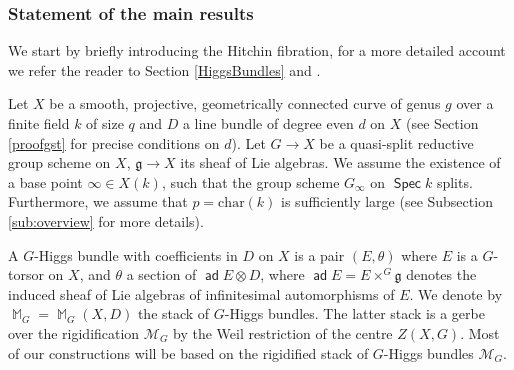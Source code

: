 \documentclass{article}
\DeclareMathOperator{\Mb}{\mathbb{M}}
\DeclareMathOperator{\G}{\mathbb{G}}
\newcommand{\Mc}{\mathcal{M}}
\DeclareMathOperator{\Spec}{\mathsf{Spec}}
\DeclareMathOperator{\ad}{\mathsf{ad}}
\newcommand{\BG}{{\mathbb{G}}}
\newcommand{\g}{\mathfrak{g} }
\theoremstyle{definition}
\theoremstyle{plain}
\begin{document}

\subsubsection*{Statement of the main results}
We start by briefly introducing the Hitchin fibration, for a more detailed account we refer the reader to Section \ref{HiggsBundles} and \cite[Section 4]{MR2653248}. 

Let $X$ be a smooth, projective, geometrically connected curve of genus $g$ over a finite field $k$ of size $q$ and $D$ a line bundle of degree even $d$ on $X$ (see Section \ref{proofgst} for precise conditions on $d$). Let $G \to X$ be a quasi-split reductive group scheme on $X$, $\g \to X$ its sheaf of Lie algebras. 
We assume the existence of a base point $\infty \in X(k)$, such that the group scheme $G_{\infty}$ on $\Spec k$ splits. Furthermore, we assume that $p = \mathrm{char}(k)$ is sufficiently large (see Subsection \ref{sub:overview} for more details).

 A $G$-Higgs bundle with coefficients in $D$ on $X$ is a pair $(E,\theta)$ where $E$ is a $G$-torsor on $X$, and $\theta$ a section of $\ad E \otimes D$, where $\ad E = E \times^{G} \g$ denotes the induced sheaf of Lie algebras of infinitesimal automorphisms of $E$. We denote by $\Mb_G = \Mb_G(X,D)$ the stack of $G$-Higgs bundles. The latter stack is a gerbe over the rigidification $\Mc_G$ by the Weil restriction of the centre $Z(X,G)$. Most of our constructions will be based on the rigidified stack of $G$-Higgs bundles $\Mc_G$.
  
 
\end{document}

